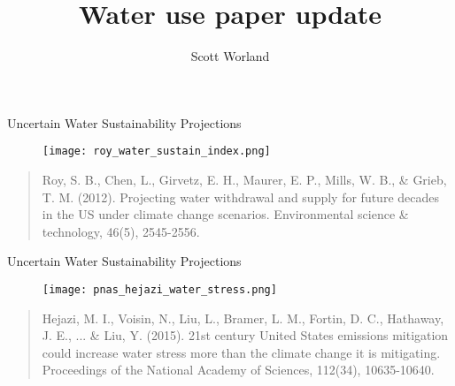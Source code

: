 \documentclass[pdf]{beamer}
\title{Water use paper update}
\author{Scott Worland}
\begin{document}
\begin{frame}
\titlepage
\end{frame}


\begin{frame}{Uncertain Water Sustainability Projections}
\begin{figure}[ht]
\begin{center}
\texttt{[image: roy\_water\_sustain\_index.png]}
\end{center}
\end{figure}

{\tiny \begin{quote} {\normalfont Roy, S. B., Chen, L., Girvetz, E. H., Maurer, E. P., Mills, W. B., \& Grieb, T. M. (2012). Projecting water withdrawal and supply for future decades in the US under climate change scenarios. Environmental science \& technology, 46(5), 2545-2556.} \end{quote}}

\end{frame}


\begin{frame}{Uncertain Water Sustainability Projections}
\begin{figure}[ht]
\begin{center}
\texttt{[image: pnas\_hejazi\_water\_stress.png]}
\end{center}
\end{figure}

{\tiny \begin{quote} {\normalfont Hejazi, M. I., Voisin, N., Liu, L., Bramer, L. M., Fortin, D. C., Hathaway, J. E., ... \& Liu, Y. (2015). 21st century United States emissions mitigation could increase water stress more than the climate change it is mitigating. Proceedings of the National Academy of Sciences, 112(34), 10635-10640.} \end{quote}}

\end{frame}

\end{document}
